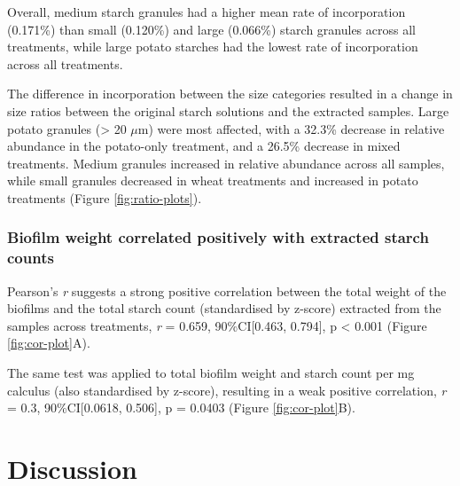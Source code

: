 \documentclass[utf8]{frontiers/frontiersSCNS}
\begin{document}
Overall, medium starch granules had a higher mean rate of incorporation
(0.171\%)
than small
(0.120\%)
and large
(0.066\%)
starch granules across all treatments, while large potato starches had the lowest
rate of incorporation across all treatments.

The difference in incorporation between the size categories resulted in a change
in size ratios between the original starch solutions and the extracted samples.
Large potato granules (\textgreater{} 20 \(\mu\)m) were most affected, with a
32.3\%
decrease in relative abundance in the potato-only treatment, and a
26.5\%
decrease in mixed treatments. Medium granules increased in relative abundance
across all samples, while small granules decreased in wheat treatments and
increased in potato treatments
(Figure \ref{fig:ratio-plots}).

\hypertarget{biofilm-weight-correlated-positively-with-extracted-starch-counts}{%
\subsubsection{Biofilm weight correlated positively with extracted starch counts}\label{biofilm-weight-correlated-positively-with-extracted-starch-counts}}

Pearson's \emph{r} suggests a
strong positive
correlation between the total weight of the biofilms and the total starch count
(standardised by z-score) extracted from the samples across treatments,
\emph{r} = 0.659,
90\%CI{[}0.463, 0.794{]},
p \textless{} 0.001
(Figure \ref{fig:cor-plot}A).

The same test was applied to total biofilm weight and starch count per mg
calculus (also standardised by z-score), resulting in a weak positive correlation,
\emph{r} = 0.3,
90\%CI{[}0.0618, 0.506{]},
p = 0.0403
(Figure \ref{fig:cor-plot}B).

\hypertarget{discussion}{%
\section{Discussion}\label{discussion}}
\end{document}
